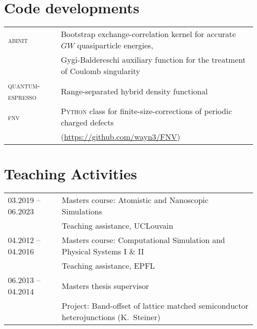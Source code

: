 \documentclass[a4paper, 11pt, DIV=15, headings=normal]{scrartcl}
\begin{document}
\section*{Code developments}
\begin{tabular}{ll}
\textsc{abinit}  & Bootstrap exchange-correlation kernel for accurate $GW$ quasiparticle energies, \\
                 & Gygi-Baldereschi auxiliary function for the treatment of
Coulomb singularity \\
\textsc{quantum-espresso} & Range-separated hybrid density functional \\
\textsc{fnv}     & \textsc{Python} class for finite-size-corrections of
periodic charged defects \\
                 & (\url{https://github.com/wayn3/FNV})
\\
\end{tabular} 

\section*{Teaching Activities}
\begin{tabular}{ll}
03.2019 -- 06.2023 & Masters course: Atomistic and Nanoscopic Simulations \\
                   & Teaching assistance, UCLouvain\\
04.2012 -- 04.2016 & Masters course: Computational Simulation and Physical Systems I \& II \\
                   & Teaching assistance, EPFL\\
06.2013 -- 04.2014 & Masters thesis supervisor\\
                   & Project: Band-offset of lattice matched semiconductor heterojunctions (K.\ Steiner)
\end{tabular}
\end{document}
